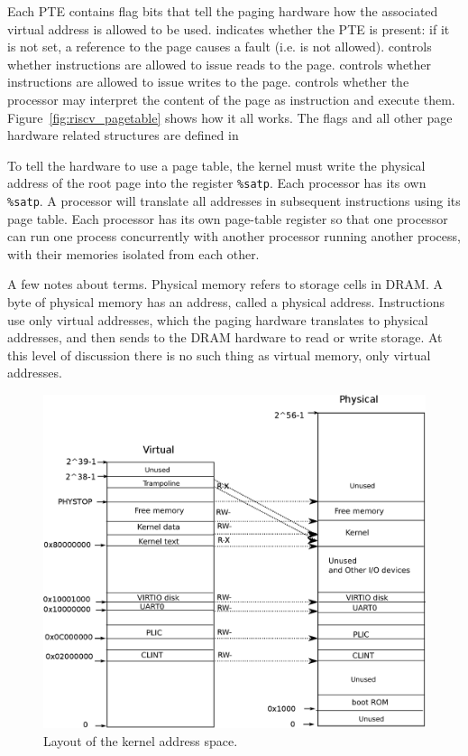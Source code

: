 Each PTE contains flag bits that tell the paging hardware
how the associated virtual address is allowed to be used.
indicates whether the PTE is present: if it is
not set, a reference to the page causes a fault (i.e. is not allowed).
controls whether instructions are allowed to issue
reads to the page.
controls whether instructions are allowed to issue
writes to the page.
controls whether the processor may interpret the content
of the page as instruction and execute them.
Figure~\ref{fig:riscv_pagetable}
shows how it all works.
The flags and all other page hardware related structures are defined in

To tell the hardware to use a page table, the kernel must
write the physical address of the root page into the register
\texttt{\%satp}.
Each processor has its own
\texttt{\%satp}.
A processor will translate all addresses in subsequent instructions
using its page table.
Each processor has its own page-table register so that one processor
can run one process concurrently with another processor running
another process, with their memories isolated from each other.

A few notes about terms.
Physical memory refers to storage cells in DRAM.
A byte of physical memory has an address, called a physical address.
Instructions use only virtual addresses, which the
paging hardware translates to physical addresses, and then
sends to the DRAM hardware to read or write storage.
At this level of discussion there is no such thing as virtual memory,
only virtual addresses.

\begin{figure}[t]
\center
\includegraphics[scale=0.5]{fig/xv6_layout.eps}
\caption{Layout of the kernel address space.}
\label{fig:xv6_layout}
\end{figure}
